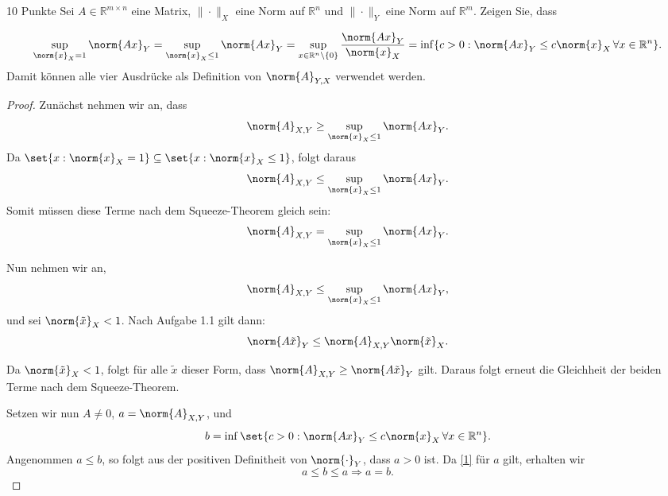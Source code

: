 \documentclass{problemset}
\begin{document}
\begin{problem}{10 Punkte}
Sei \( A \in \mathbb{R}^{m \times n} \) eine Matrix, \( \| \cdot \|_X \) eine
Norm auf \( \mathbb{R}^n \) und \( \| \cdot \|_Y \) eine Norm auf \(
\mathbb{R}^m \). Zeigen Sie, dass

\begin{equation*}
    \sup_{\norm{x}_X = 1} \norm{A x}_Y
    = \sup_{\norm{x}_X \leq 1} \norm{A x}_Y
    = \sup_{x \in \mathbb{R}^n \setminus \{0\}} \frac{\norm{A x}_Y}{\norm{x}_X}
    = \inf \{ c > 0 : \norm{A x}_Y \leq c \norm{x}_X \, \forall x \in \mathbb{R}^n \}.
\end{equation*}
Damit können alle vier Ausdrücke als Definition von \( \norm{A}_{Y,X} \)
verwendet werden.

\begin{proof}
    Zunächst nehmen wir an, dass
    \begin{equation*}
        \norm{A}_{X, Y} \ge \sup_{\norm{x}_X \le 1} \norm{A x}_Y.
    \end{equation*}
    Da \(\set{x : \norm{x}_X = 1} \subseteq \set{x : \norm{x}_X \le 1}\), folgt daraus
    \begin{equation*}
        \norm{A}_{X, Y} \le \sup_{\norm{x}_X \le 1} \norm{A x}_Y.
    \end{equation*}
    Somit müssen diese Terme nach dem Squeeze-Theorem gleich sein:
    \begin{equation*}
        \norm{A}_{X, Y} = \sup_{\norm{x}_X \le 1} \norm{A x}_Y.
    \end{equation*}

    Nun nehmen wir an,
    \begin{equation*}
        \norm{A}_{X, Y} \le \sup_{\norm{x}_X \le 1} \norm{A x}_Y,
    \end{equation*}
    und sei \(\norm{\tilde{x}}_X < 1\). Nach Aufgabe 1.1 gilt dann:
    \begin{equation}\label{1}
        \norm{A \tilde{x}}_Y \le \norm{A}_{X, Y} \norm{\tilde{x}}_X.
    \end{equation}

    Da \(\norm{\tilde{x}}_X < 1\), folgt für alle \(\tilde{x}\) dieser Form,
    dass \(\norm{A}_{X, Y} \ge \norm{A \tilde{x}}_Y\) gilt. Daraus folgt erneut
    die Gleichheit der beiden Terme nach dem Squeeze-Theorem.

    Setzen wir nun \(A \neq 0\), \(a = \norm{A}_{X,Y}\), und
    \begin{equation*}
        b = \inf \set{c > 0 : \norm{A x}_Y \leq c \norm{x}_X \, \forall x \in \mathbb{R}^n}.
    \end{equation*}
    Angenommen \(a \le b\), so folgt aus der positiven Definitheit von
    \(\norm{\cdot}_Y\), dass \(a > 0\) ist. Da \eqref{1} für \(a\) gilt,
    erhalten wir
    \begin{equation*}
        a \le b \le a \Rightarrow a = b.
    \end{equation*}


\end{proof}
\end{problem}
\end{document}
